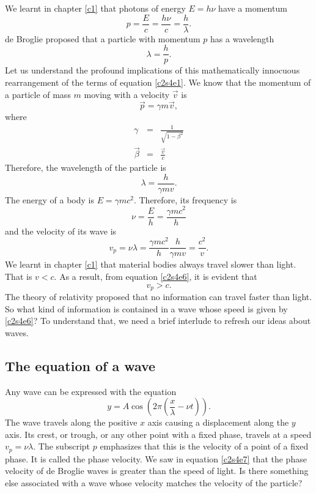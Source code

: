 We learnt in chapter \ref{c1} that photons of energy $E = h\nu$ have a momentum
\begin{equation}\label{c2s4e1}
p = \frac{E}{c} = \frac{h\nu}{c} = \frac{h}{\lambda}.
\end{equation}
de Broglie proposed that a particle with momentum $p$ has a wavelength
\begin{equation}\label{c2s4e2}
\lambda = \frac{h}{p}.
\end{equation}
Let us understand the profound implications of this mathematically innocuous
rearrangement of the terms of equation \eqref{c2s4e1}. We know that the momentum
of a particle of mass $m$ moving with a velocity $\vec{v}$ is
\begin{equation}\label{c2s4e3}
\vec{p} = \gamma m\vec{v},
\end{equation}
where 
\begin{eqnarray*}
\gamma &=& \frac{1}{\sqrt{1 - \beta^2}} \\
\vec{\beta} &=& \frac{\vec{v}}{c} 
\end{eqnarray*}
Therefore, the wavelength of the particle is
\begin{equation}\label{c2s4e4}
\lambda = \frac{h}{\gamma mv}.
\end{equation}
The energy of a body is $E = \gamma mc^2$. Therefore, its frequency is
\begin{equation}\label{c2s4e5}
\nu = \frac{E}{h} = \frac{\gamma mc^2}{h}
\end{equation}
and the velocity of its wave is
\begin{equation}\label{c2s4e6}
v_p = \nu\lambda = \frac{\gamma mc^2}{h}\frac{h}{\gamma mv} = \frac{c^2}{v}.
\end{equation}
We learnt in chapter \ref{c1} that material bodies always travel slower than
light. That is $v < c$. As a result, from equation \eqref{c2s4e6}, it is
evident that
\begin{equation}\label{c2s4e7}
v_p > c.
\end{equation}
The theory of relativity proposed that no information can travel faster than
light. So what kind of information is contained in a wave whose speed is given
by \eqref{c2s4e6}? To understand that, we need a brief interlude to refresh
our ideas about waves.

\subsection{The equation of a wave}
Any wave can be expressed with the equation
\begin{equation}\label{c2s4e8}
y = A\cos\left(2\pi\left(\frac{x}{\lambda} - \nu t\right)\right).
\end{equation}
The wave travels along the positive $x$ axis causing a displacement along the
$y$ axis. Its crest, or trough, or any other point with a fixed phase, travels
at a speed $v_p = \nu\lambda$. The subscript $p$ emphasizes that this is the
velocity of a point of a fixed phase. It is called the phase velocity. We saw
in equation \eqref{c2s4e7} that the phase velocity of de Broglie waves is
greater than the speed of light. Is there something else associated with a 
wave whose velocity matches the velocity of the particle?

